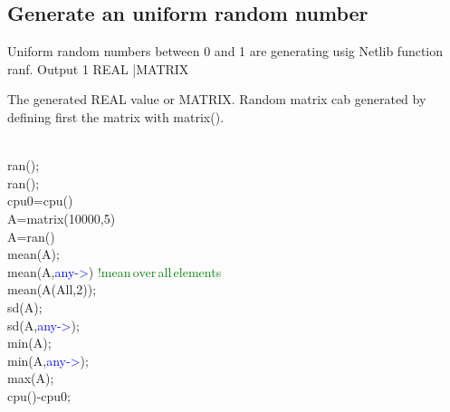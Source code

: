 \begin{itemize}
\subsection{Generate an uniform random number}
\label{ran}
Uniform random numbers between 0 and 1 are generating usig Netlib function ranf.
\vspace{0.3cm}
\hline
\vspace{0.3cm}
\noindent Output \tabto{3cm}  1 \tabto{5cm}   REAL |MATRIX   \tabto{7cm}
\begin{changemargin}{3cm}{0cm}
\noindent  The generated REAL value or MATRIX.
Random matrix cab generated by defining first the matrix with \textcolor{VioletRed}{matrix}().
\end {changemargin}
\hline
\vspace{0.2cm}
\begin{example}[ranex]\\
\label{ranex}
\textcolor{VioletRed}{ran}();\\
\textcolor{VioletRed}{ran}();\\
cpu0=cpu()\\
A=\textcolor{VioletRed}{matrix}(10000,5)\\
A=\textcolor{VioletRed}{ran}()\\
\textcolor{VioletRed}{mean}(A);\\
\textcolor{VioletRed}{mean}(A,\textcolor{blue}{any->}) \textcolor{green}{!mean\,over\,all\,elements}\\
\textcolor{VioletRed}{mean}(A(All,2));\\
\textcolor{VioletRed}{sd}(A);\\
\textcolor{VioletRed}{sd}(A,\textcolor{blue}{any->});\\
\textcolor{VioletRed}{min}(A);\\
\textcolor{VioletRed}{min}(A,\textcolor{blue}{any->});\\
\textcolor{VioletRed}{max}(A);\\
cpu()-cpu0;

\end{example}


\end{itemize}
